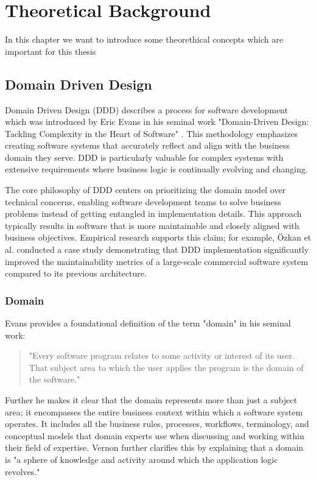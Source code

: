 \chapter{Theoretical Background}\label{chapter:theoreticalbg}
In this chapter we want to introduce some theorethical concepts which are important for this thesis

\section{Domain Driven Design}\label{sec:ddd}
Domain Driven Design (DDD) describes a process for software development which was introduced by Eric Evans in his seminal work "Domain-Driven Design: Tackling Complexity in the Heart of Software" \autocite{evans2004domain}. This methodology emphasizes creating software systems that accurately reflect and align with the business domain they serve. DDD is particularly valuable for complex systems with extensive requirements where business logic is continually evolving and changing.

The core philosophy of DDD centers on prioritizing the domain model over technical concerns, enabling software development teams to solve business problems instead of getting entangled in implementation details. This approach typically results in software that is more maintainable and closely aligned with business objectives. Empirical research supports this claim; for example, Özkan et al. \autocite{ddd-maintainability} conducted a case study demonstrating that DDD implementation significantly improved the maintainability metrics of a large-scale commercial software system compared to its previous architecture.

\subsection{Domain}
Evans provides a foundational definition of the term "domain" in his seminal work:
\begin{quote}
"Every software program relates to some activity or interest of its user. That subject area to which the user applies the program is the domain of the software."
\autocite[p.~4]{evans2004domain}
\end{quote}
Further he makes it clear that the domain represents more than just a subject area; it encompasses the entire business context within which a software system operates. It includes all the business rules, processes, workflows, terminology, and conceptual models that domain experts use when discussing and working within their field of expertise. Vernon \autocite[p.~17]{vernon2013implementing} further clarifies this by explaining that a domain is "a sphere of knowledge and activity around which the application logic revolves."

